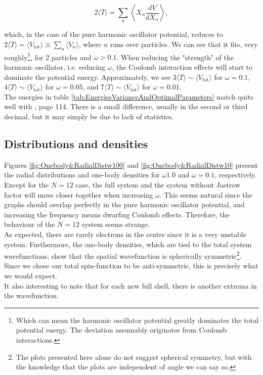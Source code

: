 \documentclass[english, a4paper]{article}
\begin{document}
	\begin{equation}
		2\langle T\rangle = \sum_n\left\langle X_n\frac{dV}{dX_n} \right\rangle,
	\end{equation}
	
	which, in the case of the pure harmonic oscillator potential, reduces to $2\langle T\rangle = \langle V_{\text{tot}}\rangle \equiv \sum_{n} \langle V_n\rangle$, where $n$ runs over particles. We can see that it fits, very roughly\footnote{Which can mean the harmonic oscillator potential greatly dominates the total potential energy. The deviation assumably originates from Coulomb interactions.}, for 2 particles and $\omega>0.1$. When reducing the "strength" of the harmonic oscillator, i.e. reducing $\omega$, the Coulomb interaction effects will start to dominate the potential energy. Approximately, we see $3\langle T\rangle \sim \langle V_{\text{tot}}\rangle$ for $\omega = 0.1$, $4\langle T\rangle \sim \langle V_{\text{tot}}\rangle$ for $\omega = 0.05$, and $7\langle T\rangle \sim \langle V_{\text{tot}}\rangle$ for $\omega = 0.01$.\\
	
	The energies in table \ref{tab:EnergiesVarianceAndOptimalParameters} match quite well with \cite{H_Msc}, page 114. There is a small difference, usually in the second or third decimal, but it may simply be due to lack of statistics.
	
	\subsection{Distributions and densities}
	Figures \ref{fig:Onebody&RadialDistw100} and \ref{fig:Onebody&RadialDistw10} present the radial distributions and one-body densities for $\omega1.0$ and $\omega = 0.1$, respectively. Except for the $N=12$ case, the full system and the system without Jastrow factor will move closer together when increasing $\omega$. This seems natural since the graphs should overlap perfectly in the pure harmonic oscillator potential, and increasing the frequency means dwarfing Coulomb effects. Therefore, the behaviour of the $N=12$ system seems strange.\\
	
	As expected, there are rarely electrons in the centre since it is a very unstable system. Furthermore, the one-body densities, which are tied to the total system wavefunctions, show that the spatial wavefunction is spherically symmetric\footnote{The plots presented here alone do not suggest spherical symmetry, but with the knowledge that the plots are independent of angle we can say so.}. Since we chose our total spin-function to be anti-symmetric, this is precisely what we would expect.\\
	It also interesting to note that for each new full shell, there is another extrema in the wavefunction.\\
	
\end{document}

